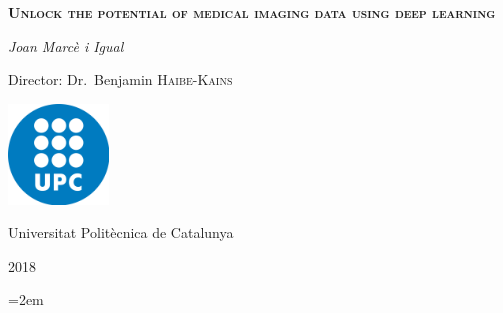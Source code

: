 \documentclass[a4paper, 12pt]{article}
\begin{document}
\begin{titlepage}
  \centering
  \vspace{1.5cm}
  {\huge \textbf{\textsc{Unlock the potential of medical imaging data using deep learning}} \par}
  \vspace{2cm}
  {\Large \textit{Joan Marcè i Igual}\par}
  \vfill
  Director: Dr.~Benjamin \textsc{Haibe-Kains}
  
  \vfill

  \includegraphics[width=0.2\textwidth]{images/logo_upc}\par\vspace{1cm}
  \vfill
  
  {\LARGE Universitat Politècnica de Catalunya \par}
  {\LARGE 2018 \par}
\end{titlepage}

\tableofcontents
\listoffigures
\listoftables

\pagebreak







\pagebreak
\emergencystretch=2em
\printbibliography{}
\end{document}
